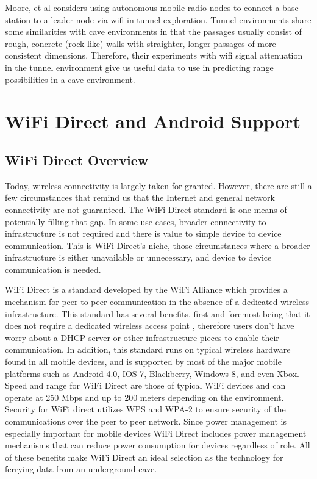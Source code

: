 \documentclass[10pt,twocolumn]{article}
\begin{document}
Moore, et al \cite{moore2012} considers using autonomous mobile radio nodes to connect a base station to a leader node via wifi in tunnel exploration. 
Tunnel environments share some similarities with cave environments in that the passages usually consist of rough, concrete (rock-like) walls with straighter, longer passages of more consistent dimensions. 
Therefore, their experiments with wifi signal attenuation in the tunnel environment give us useful data to use in predicting range possibilities in a cave environment.

\section{WiFi Direct and Android Support}

\subsection{WiFi Direct Overview}
\label{sec:WifiD Overview}
Today, wireless connectivity is largely taken for granted. 
However, there are still a few circumstances that remind us that the Internet and general network connectivity are not guaranteed. 
The WiFi Direct standard is one means of potentially filling that gap. 
In some use cases, broader connectivity to infrastructure is not required and there is value to simple device to device communication. 
This is WiFi Direct's niche, those circumstances where a broader infrastructure is either unavailable or unnecessary, and device to device communication is needed.

WiFi Direct is a standard developed by the WiFi Alliance which provides a mechanism for peer to peer communication in the absence of a dedicated wireless infrastructure. 
This standard has several benefits, first and foremost being that it does not require a dedicated wireless access point \cite{whywifid}, therefore users don't have worry about a DHCP server or other infrastructure pieces to enable their communication. 
In addition, this standard runs on typical wireless hardware found in all mobile devices, and is supported by most of the major mobile platforms such as Android 4.0, IOS 7, Blackberry, Windows 8, and even Xbox. 
Speed and range for WiFi Direct are those of typical WiFi devices and can operate at 250 Mbps and up to 200 meters depending on the environment. 
Security for WiFi direct utilizes WPS and WPA-2 to ensure security of the communications over the peer to peer network. 
Since power management is especially important for mobile devices WiFi Direct includes power management mechanisms that can reduce power consumption for devices regardless of role.
All of these benefits make WiFi Direct an ideal selection as the technology for ferrying data from an underground cave.
\end{document}
